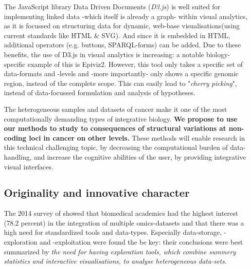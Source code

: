 \documentclass[twoside,fontsize=10pt]{article}
\begin{document}
The JavaScript library Data Driven Documents (\textit{D3.js}) is well suited for implementing linked data -which itself is already a graph- within visual analytics, as it is focussed on structuring data for dynamic, web-base visualisations(using current standards like HTML \& SVG)\cite{Bostock2011}. And since it is embedded in HTML, additional operators (e.g. buttons, SPARQL-forms) can be added. Due to these benefits, the use of D3.js in visual analytics is increasing: a notable biology-specific example of this is Epiviz2\cite{Chelaru2014}. However, this tool only takes a specific set of data-formats and -levels and -more importantly- only shows a specific genomic region, instead of the complete scope. This can easily lead to "\textit{cherry picking}", instead of data-focussed formulation and analysis of hypotheses.
\medskip

\noindent 
The heterogeneous samples and datasets of cancer make it one of the most computationally demanding types of integrative biology. \textbf{We propose to use our methods to study to consequences of structural variations at non-coding loci in cancer on other levels.}  These methods will enable research in this technical challenging topic, by decreasing the computational burden of data-handling, and increase the cognitive abilities of the user, by providing integrative visual interfaces. 



%



\subsection*{Originality and innovative character} 
The 2014 survey of \citet{Gomez-Cabrero2014} showed that biomedical academics had the highest interest (78.2 percent) in the integration of multiple omics-datasets and that there was a high need for standardized tools and data-types. Especially data-storage, -exploration and -exploitation were found the be key: their conclusions were best summarized by \textit{the need for having exploration tools, which combine summery statistics and interactive visualisations, to analyse heterogeneous data-sets}.
\medskip
\end{document}
